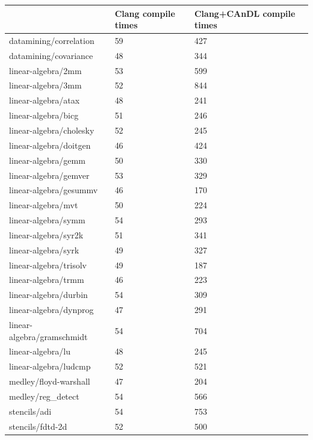 \begin{table}
    \centering
    \begin{tabular}{lll}
        \toprule
        & Clang compile times& Clang+CAnDL compile times\\
        \midrule
        datamining/correlation     & 59 & 427 \\
        datamining/covariance      & 48 & 344 \\
        linear-algebra/2mm         & 53 & 599 \\
        linear-algebra/3mm         & 52 & 844 \\
        linear-algebra/atax        & 48 & 241 \\
        linear-algebra/bicg        & 51 & 246 \\
        linear-algebra/cholesky    & 52 & 245 \\
        linear-algebra/doitgen     & 46 & 424 \\
        linear-algebra/gemm        & 50 & 330 \\
        linear-algebra/gemver      & 53 & 329 \\
        linear-algebra/gesummv     & 46 & 170 \\
        linear-algebra/mvt         & 50 & 224 \\
        linear-algebra/symm        & 54 & 293 \\
        linear-algebra/syr2k       & 51 & 341 \\
        linear-algebra/syrk        & 49 & 327 \\
        linear-algebra/trisolv     & 49 & 187 \\
        linear-algebra/trmm        & 46 & 223 \\
        linear-algebra/durbin      & 54 & 309 \\
        linear-algebra/dynprog     & 47 & 291 \\
        linear-algebra/gramschmidt & 54 & 704 \\
        linear-algebra/lu          & 48 & 245 \\
        linear-algebra/ludcmp      & 52 & 521 \\
        medley/floyd-warshall      & 47 & 204 \\
        medley/reg\_detect         & 54 & 566 \\
        stencils/adi               & 54 & 753 \\
        stencils/fdtd-2d           & 52 & 500 \\

\end{tabular}
\end{table}

